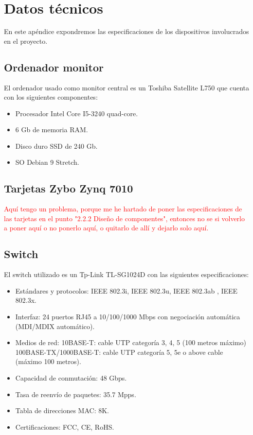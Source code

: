 \chapter{Datos técnicos}
En este apéndice expondremos las especificaciones de los dispositivos involucrados en el proyecto.

\section{Ordenador monitor}
El ordenador usado como monitor central es un Toshiba Satellite L750 que cuenta con los siguientes componentes:
\begin{itemize}
	\item Procesador Intel Core I5-3240 quad-core.
	\item 6 Gb de memoria RAM.
	\item Disco duro SSD de 240 Gb.
	\item SO Debian 9 Stretch.
\end{itemize}

\section{Tarjetas Zybo Zynq 7010}
\textcolor{red}{Aquí tengo un problema, porque me he hartado de poner las especificaciones de las tarjetas en el punto "2.2.2 Diseño de componentes", entonces no se si volverlo a poner aquí o no ponerlo aquí, o quitarlo de allí y dejarlo solo aquí.}

\section{Switch}
El switch utilizado es un Tp-Link TL-SG1024D con las siguientes especificaciones:
\begin{itemize}
	\item Estándares y protocolos: IEEE 802.3i, IEEE 802.3u, IEEE 802.3ab , IEEE 802.3x.
	\item Interfaz: 24 puertos RJ45 a 10/100/1000 Mbps con negociación automática
	(MDI/MDIX automático).
	\item Medios de red: 10BASE-T: cable UTP categoría 3, 4, 5 (100 metros máximo)
	100BASE-TX/1000BASE-T: cable UTP categoría 5, 5e o above cable (máximo 100 metros).
	\item Capacidad de conmutación: 48 Gbps.
	\item Tasa de reenvío de paquetes: 35.7 Mpps.
	\item Tabla de direcciones MAC: 8K.
	\item Certificaciones: FCC, CE, RoHS.
\end{itemize}